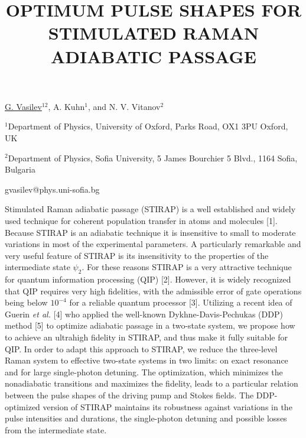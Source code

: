 \title{OPTIMUM PULSE SHAPES FOR STIMULATED RAMAN \mbox{ADIABATIC} PASSAGE}

\underline{G. Vasilev}$^{12}$, A. Kuhn$^1$, and N. V. Vitanov$^{2}$   

{\normalsize{\vspace{-4mm}
$^1$Department of Physics, University of Oxford, Parks Road, OX1 3PU Oxford, UK%

\vspace{-4mm} $^2$Department of Physics, Sofia University, 5 James Bourchier 5 Blvd., 1164 Sofia, Bulgaria%

\email gvasilev@phys.uni-sofia.bg}}

Stimulated Raman adiabatic passage (STIRAP) is a well established
and widely used technique for coherent population transfer in atoms
and molecules [1]. Because STIRAP is an adiabatic technique it is
insensitive to small to moderate variations in most of the
experimental parameters. A particularly remarkable and very useful
feature of STIRAP is its insensitivity to the properties of the
intermediate state $\psi_2$. For these reasons STIRAP is a very
attractive technique for quantum information processing (QIP) [2].
However, it is widely recognized that QIP requires very high
fidelities, with the admissible error of gate operations being below
$10^{-4}$ for a reliable quantum processor [3]. Utilizing a recent
idea of Guerin \emph{et al.} [4] who applied the well-known
Dykhne-Davis-Pechukas (DDP) method [5] to optimize adiabatic passage
in a two-state system, we propose how to achieve an ultrahigh
fidelity in STIRAP, and thus make it fully suitable for QIP. In
order to adapt this approach to STIRAP, we reduce the three-level
Raman system to effective two-state systems in two limits: on exact
resonance and for large single-photon detuning. The optimization,
which minimizes the nonadiabatic transitions and maximizes the
fidelity, leads to a particular relation between the pulse shapes of
the driving pump and Stokes fields. The DDP-optimized version of
STIRAP maintains its robustness against variations in the pulse
intensities and durations, the single-photon detuning and possible
losses from the intermediate state.

